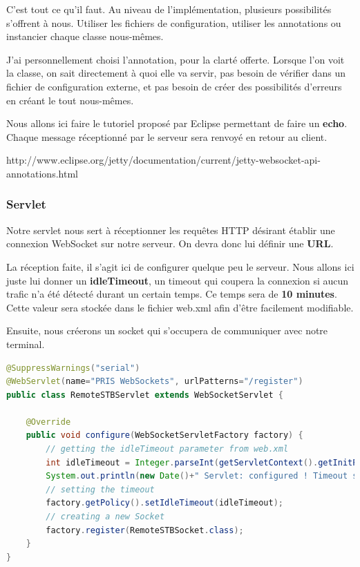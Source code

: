 \medskip

C'est tout ce qu'il faut. Au niveau de l'implémentation, plusieurs possibilités s'offrent à nous. Utiliser les fichiers de configuration, utiliser les annotations ou instancier chaque classe nous-mêmes.

J'ai personnellement choisi l'annotation, pour la clarté offerte. Lorsque l'on voit la classe, on sait directement à quoi elle va servir, pas besoin de vérifier dans un fichier de configuration externe, et pas besoin de créer des possibilités d'erreurs en créant le tout nous-mêmes.

\medskip

Nous allons ici faire le tutoriel proposé par Eclipse permettant de faire un \textbf{echo}. Chaque message réceptionné par le serveur sera renvoyé en retour au client.

http://www.eclipse.org/jetty/documentation/current/jetty-websocket-api-annotations.html

\subsubsection{Servlet}
Notre servlet nous sert à réceptionner les requêtes HTTP désirant établir une connexion WebSocket sur notre serveur. On devra donc lui définir une \textbf{URL}.

\medskip

La réception faite, il s'agit ici de configurer quelque peu le serveur. Nous allons ici juste lui donner un \textbf{idleTimeout}, un timeout qui coupera la connexion si aucun trafic n'a été détecté durant un certain temps. Ce temps sera de \textbf{10 minutes}. Cette valeur sera stockée dans le fichier web.xml afin d'être facilement modifiable.

\medskip

Ensuite, nous créerons un socket qui s'occupera de communiquer avec notre terminal.

\begin{lstlisting}[language=Java, caption={Servlet de réception de requêtes HTTP}]
@SuppressWarnings("serial")
@WebServlet(name="PRIS WebSockets", urlPatterns="/register")
public class RemoteSTBServlet extends WebSocketServlet {
 
    @Override
    public void configure(WebSocketServletFactory factory) {
    	// getting the idleTimeout parameter from web.xml
    	int idleTimeout = Integer.parseInt(getServletContext().getInitParameter("idleTimeout"));
    	System.out.println(new Date()+" Servlet: configured ! Timeout set to "+idleTimeout+" ms");
    	// setting the timeout
    	factory.getPolicy().setIdleTimeout(idleTimeout);
    	// creating a new Socket
        factory.register(RemoteSTBSocket.class);
    }
}
\end{lstlisting}

